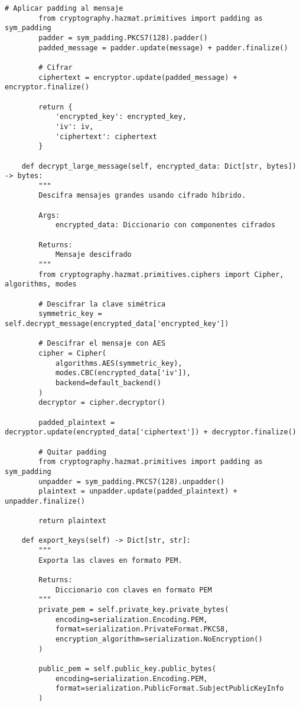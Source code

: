 \documentclass[12pt,a4paper]{article}
\begin{document}
\begin{lstlisting}[caption=Implementación de cifrado asimétrico con RSA]
        # Aplicar padding al mensaje
        from cryptography.hazmat.primitives import padding as sym_padding
        padder = sym_padding.PKCS7(128).padder()
        padded_message = padder.update(message) + padder.finalize()
        
        # Cifrar
        ciphertext = encryptor.update(padded_message) + encryptor.finalize()
        
        return {
            'encrypted_key': encrypted_key,
            'iv': iv,
            'ciphertext': ciphertext
        }
    
    def decrypt_large_message(self, encrypted_data: Dict[str, bytes]) -> bytes:
        """
        Descifra mensajes grandes usando cifrado híbrido.
        
        Args:
            encrypted_data: Diccionario con componentes cifrados
            
        Returns:
            Mensaje descifrado
        """
        from cryptography.hazmat.primitives.ciphers import Cipher, algorithms, modes
        
        # Descifrar la clave simétrica
        symmetric_key = self.decrypt_message(encrypted_data['encrypted_key'])
        
        # Descifrar el mensaje con AES
        cipher = Cipher(
            algorithms.AES(symmetric_key),
            modes.CBC(encrypted_data['iv']),
            backend=default_backend()
        )
        decryptor = cipher.decryptor()
        
        padded_plaintext = decryptor.update(encrypted_data['ciphertext']) + decryptor.finalize()
        
        # Quitar padding
        from cryptography.hazmat.primitives import padding as sym_padding
        unpadder = sym_padding.PKCS7(128).unpadder()
        plaintext = unpadder.update(padded_plaintext) + unpadder.finalize()
        
        return plaintext
    
    def export_keys(self) -> Dict[str, str]:
        """
        Exporta las claves en formato PEM.
        
        Returns:
            Diccionario con claves en formato PEM
        """
        private_pem = self.private_key.private_bytes(
            encoding=serialization.Encoding.PEM,
            format=serialization.PrivateFormat.PKCS8,
            encryption_algorithm=serialization.NoEncryption()
        )
        
        public_pem = self.public_key.public_bytes(
            encoding=serialization.Encoding.PEM,
            format=serialization.PublicFormat.SubjectPublicKeyInfo
        )
        

\end{lstlisting}
\end{document}
